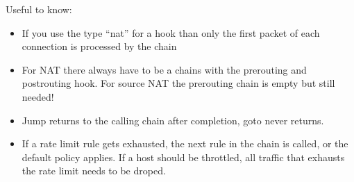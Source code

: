 \documentclass{report}
\begin{document}
Useful to know:

\begin{itemize}
\item
  If you use the type ``nat'' for a hook than only the first packet of
  each connection is processed by the chain
\item
  For NAT there always have to be a chains with the prerouting and
  postrouting hook. For source NAT the prerouting chain is empty but
  still needed!
\item
  Jump returns to the calling chain after completion, goto never
  returns.
\item
  If a rate limit rule gets exhausted, the next rule in the chain is
  called, or the default policy applies. If a host should be throttled,
  all traffic that exhausts the rate limit needs to be droped.

\end{itemize}
\end{document}
